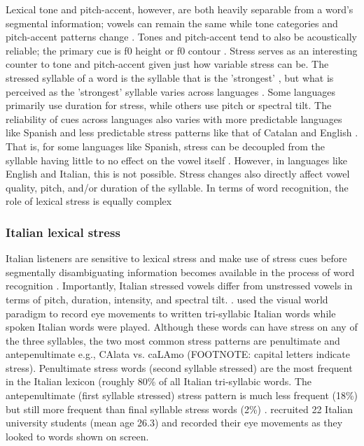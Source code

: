 Lexical tone and pitch-accent, however, are both heavily separable from a word's segmental information; vowels can remain the same while tone categories and pitch-accent patterns change \citep{Zeng2017}. Tones and pitch-accent tend to also be acoustically reliable; the primary cue is f0 height or f0 contour \citep{goss_2014}.  Stress serves as an interesting counter to tone and pitch-accent given just how variable stress can be. The stressed syllable of a word is the syllable that is the 'strongest' \citep{sluijter1996spectral}, but what is perceived as the 'strongest' syllable varies across languages \citep{Cutler1988}. Some languages primarily use duration for stress, while others use pitch or spectral tilt. The reliability of cues across languages also varies with more predictable languages like Spanish and less predictable stress patterns like that of Catalan and English \citep{ortega_2011, beckman_1994}. That is, for some languages like Spanish, stress can be decoupled from the syllable having little to no effect on the vowel itself \citep{ortega_2011}. However, in languages like English and Italian, this is not possible. Stress changes also directly affect vowel quality, pitch, and/or duration of the syllable. In terms of word recognition, the role of lexical stress is equally complex \citep{cutler2001voornaam, Reinisch2010}

\subsubsection{Italian lexical stress}
Italian listeners are sensitive to lexical stress and make use of stress cues before segmentally disambiguating information becomes available in the process of word recognition \citep{Tagliapietra2005, Sulpizio_McQueen_2012}. Importantly, Italian stressed vowels differ from unstressed vowels in terms of pitch, duration, intensity, and spectral tilt. \citep{Maturi1998}. \cite{Sulpizio_McQueen_2012} used the visual world paradigm to record eye movements to written tri-syllabic Italian words while spoken Italian words were played. Although these words can have stress on any of the three syllables, the two most common stress patterns are penultimate and antepenultimate e.g., CAlata vs. caLAmo (FOOTNOTE: capital letters indicate stress). Penultimate stress words (second syllable stressed) are the most frequent in the Italian lexicon (roughly 80\% of all Italian tri-syllabic words. The antepenultimate (first syllable stressed) stress pattern is much less frequent (18\%) but still more frequent than final syllable stress words (2\%) \citep{thornton_1997}. \cite{Sulpizio_McQueen_2012} recruited 22 Italian university students (mean age 26.3) and recorded their eye movements as they looked to words shown on screen.

